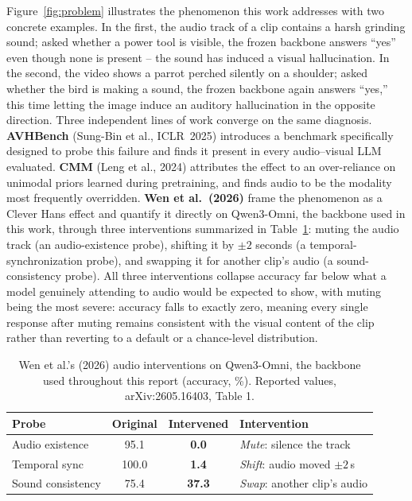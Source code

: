 \documentclass[11pt,a4paper,oneside]{article}
\begin{document}
Figure~\ref{fig:problem} illustrates the phenomenon this work addresses with two concrete examples.
In the first, the audio track of a clip contains a harsh grinding sound; asked whether a power tool is
visible, the frozen backbone answers ``yes'' even though none is present -- the sound has induced a
visual hallucination. In the second, the video shows a parrot perched silently on a shoulder; asked
whether the bird is making a sound, the frozen backbone again answers ``yes,'' this time letting the
image induce an auditory hallucination in the opposite direction. Three independent lines of work
converge on the same diagnosis. \textbf{AVHBench} (Sung-Bin et al., ICLR~2025) introduces a
benchmark specifically designed to probe this failure and finds it present in every audio--visual LLM
evaluated. \textbf{CMM} (Leng et al., 2024) attributes the effect to an over-reliance on unimodal
priors learned during pretraining, and finds audio to be the modality most frequently overridden.
\textbf{Wen et al.\ (2026)} frame the phenomenon as a Clever Hans effect and quantify it directly on
Qwen3-Omni, the backbone used in this work, through three interventions summarized in
Table~\ref{tab:wen-interventions}: muting the audio track (an audio-existence probe), shifting it by
$\pm2$ seconds (a temporal-synchronization probe), and swapping it for another clip's audio (a
sound-consistency probe). All three interventions collapse accuracy far below what a model
genuinely attending to audio would be expected to show, with muting being the most severe: accuracy
falls to exactly zero, meaning every single response after muting remains consistent with the visual
content of the clip rather than reverting to a default or a chance-level distribution.

\begin{table}[h]
\centering
\small
\begin{tabular}{lccl}
\toprule
Probe & Original & Intervened & Intervention \\
\midrule
Audio existence   & 95.1  & \textcolor{red!70!black}{\textbf{0.0}}  & \emph{Mute}: silence the track \\
Temporal sync     & 100.0 & \textcolor{red!70!black}{\textbf{1.4}}  & \emph{Shift}: audio moved $\pm2$\,s \\
Sound consistency & 75.4  & \textcolor{red!70!black}{\textbf{37.3}} & \emph{Swap}: another clip's audio \\
\bottomrule
\end{tabular}
\caption{Wen et al.'s (2026) audio interventions on Qwen3-Omni, the backbone used throughout this
report (accuracy, \%). Reported values, arXiv:2605.16403, Table 1.}
\label{tab:wen-interventions}
\end{table}
\end{document}
